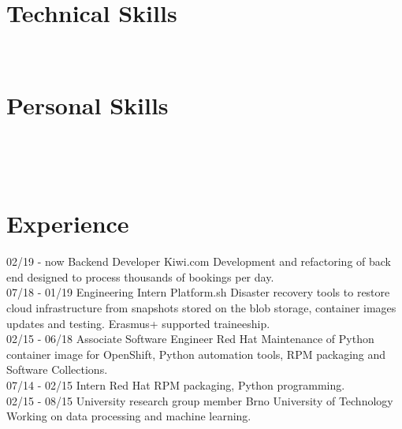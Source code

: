 \documentclass[]{friggeri-cv}
\begin{document}
\begin{aside}
  \section{Technical Skills}
    ~
  \section{Personal Skills}
    ~
\end{aside}
~
\section{Experience}
\begin{entrylist}
  \entry
    {02/19 - now}
    {Backend Developer}
    {Kiwi.com}
    {Development and refactoring of back end designed to process thousands of bookings per day.\\}
  \entry
    {07/18 - 01/19}
    {Engineering Intern}
    {Platform.sh}
    {Disaster recovery tools to restore cloud infrastructure from snapshots stored on the blob storage,
    container images updates and testing. Erasmus+ supported traineeship.\\}
  \entry
    {02/15 - 06/18}
    {Associate Software Engineer}
    {Red Hat}
    {Maintenance of Python container image for OpenShift, Python automation tools, RPM packaging and
    Software Collections.\\}
  \entry
    {07/14 - 02/15}
    {Intern}
    {Red Hat}
    {RPM packaging, Python programming.\\}
  \entry
    {02/15 - 08/15}
    {University research group member}
    {Brno University of Technology}
    {Working on data processing and machine learning.\\}
\end{entrylist}
~
\end{document}
